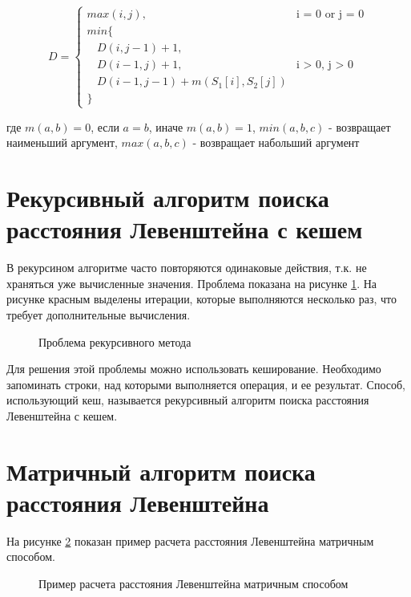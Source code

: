 \begin{equation*}
  D = 
  \begin{cases}
    max(i,j), &\text{i = 0 or j = 0}\\
    min\{ \\
      ~~~~D(i,j-1)+1,\\
      ~~~~D(i-1,j)+1, &\text{i > 0, j > 0}\\
      ~~~~D(i-1,j-1)+m(S_1[i],S_2[j])\\
    \}
    \end{cases}
\end{equation*}

где $m(a,b) = 0$, если $a=b$, иначе $m(a,b) = 1$, $min(a,b,c)$ - возвращает наименьший аргумент, 
$max(a,b,c)$ - возвращает набольший аргумент

\section{Рекурсивный алгоритм поиска расстояния Левенштейна с кешем}\label{RecursiveKeshLeventshein}

В рекурсином алгоритме часто повторяются одинаковые действия, т.к. не храняться уже вычисленные значения. 
Проблема показана на рисунке \ref{ris:problem_levenshtein_example}. На рисунке красным выделены итерации, 
которые выполняются несколько раз, что требует дополнительные вычисления.


\begin{figure}[H]
  \caption{Проблема рекурсивного метода}
  \label{ris:problem_levenshtein_example}
\end{figure}

Для решения этой проблемы можно использовать кеширование. Необходимо запоминать строки, над которыми выполняется операция, и ее результат.
Способ, использующий кеш, называется рекурсивный алгоритм поиска расстояния Левенштейна с кешем.

\section{Матричный алгоритм поиска расстояния Левенштейна}\label{MatrixLeventshein}

На рисунке \ref{ris:matrix_example} показан пример расчета расстояния Левенштейна матричным способом.

\begin{figure}[H]
  \caption{Пример расчета расстояния Левенштейна матричным способом}
  \label{ris:matrix_example}
\end{figure}

